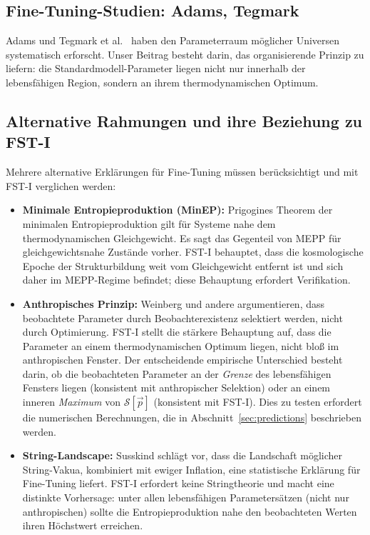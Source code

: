 \documentclass[12pt,a4paper]{article}
\theoremstyle{remark}
\begin{document}
\subsection{Fine-Tuning-Studien: Adams, Tegmark}

Adams \citep{Adams2019} und Tegmark et al.\ \citep{Tegmark2006} haben den Parameterraum m\"oglicher Universen systematisch erforscht. Unser Beitrag besteht darin, das organisierende Prinzip zu liefern: die Standardmodell-Parameter liegen nicht nur innerhalb der lebensfähigen Region, sondern an ihrem thermodynamischen Optimum.

\subsection{Alternative Rahmungen und ihre Beziehung zu FST-I}

Mehrere alternative Erkl\"arungen f\"ur Fine-Tuning m\"ussen ber\"ucksichtigt und mit FST-I verglichen werden:

\begin{itemize}
    \item \textbf{Minimale Entropieproduktion (MinEP):} Prigogines Theorem der minimalen Entropieproduktion gilt f\"ur Systeme nahe dem thermodynamischen Gleichgewicht. Es sagt das Gegenteil von MEPP f\"ur gleichgewichtsnahe Zust\"ande vorher. FST-I behauptet, dass die kosmologische Epoche der Strukturbildung weit vom Gleichgewicht entfernt ist und sich daher im MEPP-Regime befindet; diese Behauptung erfordert Verifikation.
    \item \textbf{Anthropisches Prinzip:} Weinberg \citep{Weinberg1987} und andere argumentieren, dass beobachtete Parameter durch Beobachterexistenz selektiert werden, nicht durch Optimierung. FST-I stellt die st\"arkere Behauptung auf, dass die Parameter an einem thermodynamischen Optimum liegen, nicht blo\ss{} im anthropischen Fenster. Der entscheidende empirische Unterschied besteht darin, ob die beobachteten Parameter an der \emph{Grenze} des lebensfähigen Fensters liegen (konsistent mit anthropischer Selektion) oder an einem inneren \emph{Maximum} von $\mathcal{S}[\vec{p}]$ (konsistent mit FST-I). Dies zu testen erfordert die numerischen Berechnungen, die in Abschnitt~\ref{sec:predictions} beschrieben werden.
    \item \textbf{String-Landscape:} Susskind \citep{Susskind2005} schl\"agt vor, dass die Landschaft m\"oglicher String-Vakua, kombiniert mit ewiger Inflation, eine statistische Erkl\"arung f\"ur Fine-Tuning liefert. FST-I erfordert keine Stringtheorie und macht eine distinkte Vorhersage: unter allen lebensfähigen Parametersätzen (nicht nur anthropischen) sollte die Entropieproduktion nahe den beobachteten Werten ihren H\"ochstwert erreichen.
\end{itemize}
\end{document}
